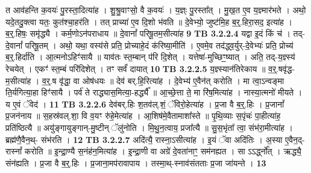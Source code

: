\documentclass[17pt]{extarticle}
\begin{document}
{{{{{{{{{{{{{{{{{{{                  त आव॑हन्ति क॒वयः॑ पु॒रस्ता॒दित्या॑ह । शु॒श्रु॒वाꣳसो॒ वै क॒वयः॑ । य॒ज्ञ्ः पु॒रस्ता᳚त् । मु॒ख॒त ए॒व य॒ज्ञ्मार॑भते । अथो॒ यदे॒तदु॒क्त्वा यतः॒ कुत॑श्चा॒हर॑ति । तत् प्राच्या॑ ए॒व दि॒शो भ॑वति ॥ दे॒वेभ्यो॒ जुष्ट॑मि॒ह ब॒र्॒.हिरा॒सद॒ इत्या॑ह । ब॒र्॒.हिषः॒ समृ॑द्ध्यै । कर्म॒णोऽन॑पराधाय ॥ दे॒वानां᳚ परिषू॒तम॒सीत्या॑ह \textbf{ 9} \newline
                  \newline
                                \textbf{ TB 3.2.2.4} \newline
                  यद्वा इ॒दं किं च॑ । तद्-दे॒वानां᳚ परिषू॒तम् । अथो॒ यथा॒ वस्य॑से प्रति॒ प्रोच्याहे॒दं क॑रिष्या॒मीति॑ । ए॒वमे॒व तद॑द्ध्व॒र्युर्-दे॒वेभ्यः॑ प्रति॒ प्रोच्य॑ ब॒र्॒.हिर्दा॑ति । आ॒त्मनोऽहिꣳ॑सायै ॥ याव॑तः स्त॒म्बान् प॑रि दि॒शेत् । यत्तेषा॑-मुच्छिꣳ॒॒ष्यात् । अति॒ तद्-य॒ज्ञ्स्य॑ रेचयेत् । एकꣳ॑ स्त॒म्बं परि॑दिशेत् । तꣳ सर्वं॑ दायात् \textbf{ 10} \newline
                  \newline
                                \textbf{ TB 3.2.2.5} \newline
                  य॒ज्ञ्स्यान॑तिरेकाय ॥ व॒र्॒.षवृ॑द्ध-म॒सीत्या॑ह । व॒र्॒.ष वृ॑द्धा॒ वा ओष॑धयः ॥ देव॑ बर्.हि॒रित्या॑ह । दे॒वेभ्य॑ ए॒वैन॑त् करोति । मा त्वा॒ऽन्वङ्मा ति॒र्यगित्या॒हा हिꣳ॑सायै । पर्व॑ ते राद्ध्यास॒मित्या॒-हर्द्ध्यै᳚ ॥ आ॒च्छे॒त्ता ते॒ मा रि॑ष॒मित्या॑ह । नास्या॒त्मनो॑ मीयते । य ए॒वं ॅवेद॑ । \textbf{ 11} \newline
                  \newline
                                \textbf{ TB 3.2.2.6} \newline
                  देव॑बर्.हिः श॒तव॑ल्.शं॒ ॅविरो॒हेत्या॑ह । प्र॒जा वै ब॒र्॒.हिः । प्र॒जानां᳚ प्र॒जन॑नाय ॥ स॒हस्र॑वल्.शा॒ वि व॒यꣳ रु॑हे॒मेत्या॑ह । आ॒शिष॑मे॒वैतामाशा᳚स्ते ॥ पृ॒थि॒व्याः स॒पृंचः॑ पा॒हीत्या॑ह॒ प्रति॑ष्ठित्यै ॥ अयु॑ङ्गायुङ्गान्-मु॒ष्टीन् ॅलु॑नोति । मि॒थु॒न॒त्वाय॒ प्रजा᳚त्यै ॥ सु॒स॒भृंता᳚ त्वा॒ संभ॑रा॒मीत्या॑ह । ब्रह्म॑णै॒वैन॒थ्- संभ॑रति । \textbf{ 12} \newline
                  \newline
                                \textbf{ TB 3.2.2.7} \newline
                  अदि॑त्यै॒ रास्ना॒ऽसीत्या॑ह । इ॒यं ॅवा अदि॑तिः । अ॒स्या ए॒वैन॒द्-रास्नां᳚ करोति ॥ इ॒न्द्रा॒ण्यै स॒नंह॑न॒मित्या॑ह । इ॒न्द्रा॒णी वा अग्रे॑ दे॒वता॑नाꣳ॒॒ सम॑नह्यत । सा ऽऽर्द्ध्नो᳚त् । ऋद्ध्यै॒ संन॑ह्यति । प्र॒जा वै ब॒र्॒.हिः । प्र॒जाना॒मप॑रावापाय । तस्मा॒थ्-स्नाव॑संतताः प्र॒जा जा॑यन्ते । \textbf{ 13} \newline
}}}}}}}}}}}}}}}}}}}
\end{document}
